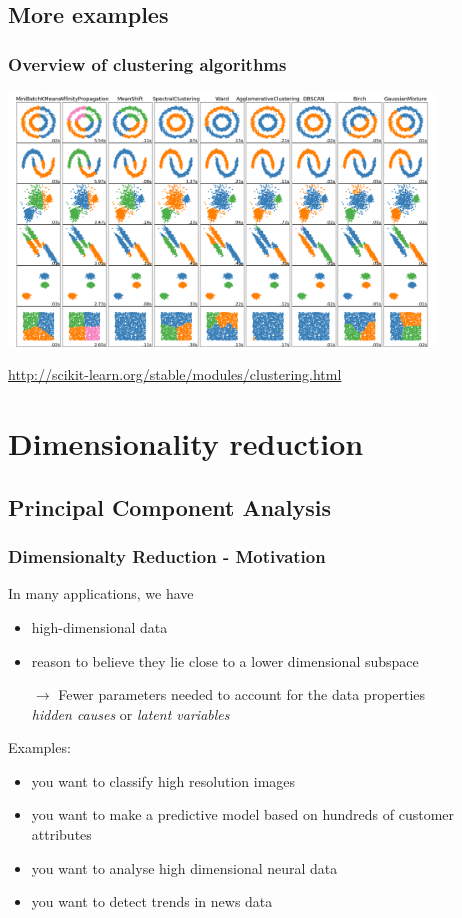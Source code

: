 \documentclass[Nike]{tuberlinbeamer}
\begin{document}
\subsection{More examples}
\begin{frame}
  \frametitle{Overview of clustering algorithms}
  \begin{center}
    \includegraphics[width=0.85\textwidth]{sklearn_doc_examples.png}
  \end{center}
  \tiny \url{http://scikit-learn.org/stable/modules/clustering.html} \cite{pedregosa2011scikit}
\end{frame}


\section{Dimensionality reduction}
\subsection{Principal Component Analysis}
\begin{frame}\frametitle{Dimensionalty Reduction - Motivation}
In many applications, we have
\begin{itemize}
\item high-dimensional data
\item reason to believe they lie close to a lower dimensional subspace
\item[$\rightarrow$] Fewer parameters needed to account for the data properties \\
{\em hidden causes} or {\em latent variables}
\end{itemize}
\vspace{1em} \pause
Examples:
\begin{itemize}
\item you want to classify high resolution images
\item you want to make a predictive model based on hundreds of customer attributes
\item you want to analyse high dimensional neural data
\item you want to detect trends in news data
\end{itemize}
\end{frame}
\end{document}
